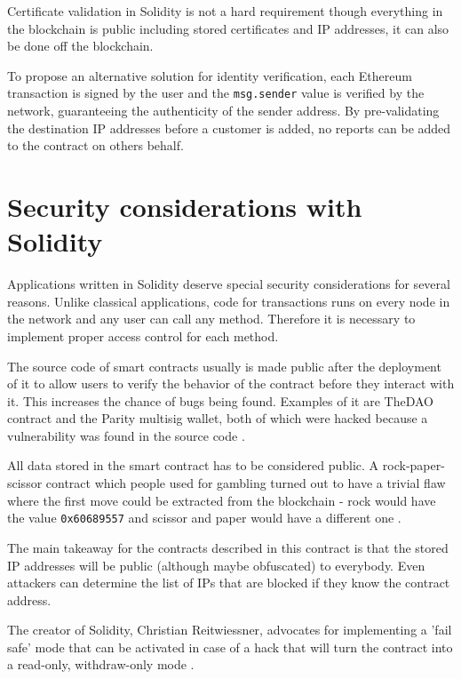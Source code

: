 Certificate validation in Solidity is not a hard requirement though \textemdash{} everything in the blockchain is public including stored certificates and IP addresses, it can also be done off the blockchain.

To propose an alternative solution for identity verification, each Ethereum transaction is signed by the user and the \texttt{msg.sender} value is verified by the network, guaranteeing the authenticity of the sender address. By pre-validating the destination IP addresses before a customer is added, no reports can be added to the contract on others behalf.


\section{Security considerations with Solidity}

Applications written in Solidity deserve special security considerations for several reasons.
Unlike classical applications, code for transactions runs on every node in the network and any user can call any method. Therefore it is necessary to implement proper access control for each method.

The source code of smart contracts usually is made public after the deployment of it to allow users to verify the behavior of the contract before they interact with it. This increases the chance of bugs being found. Examples of it are TheDAO contract and the Parity multisig wallet, both of which were hacked because a vulnerability was found in the source code \cite{DAO} \cite{MultisigHack}.

All data stored in the smart contract has to be considered public. A rock-paper-scissor contract which people used for gambling turned out to have a trivial flaw where the first move could be extracted from the blockchain - rock would have the value \texttt{0x60689557} and scissor and paper would have a different one \cite{ThinkingAboutSmartContractSecurity}.

The main takeaway for the contracts described in this contract is that the stored IP addresses will be public (although maybe obfuscated) to everybody. Even attackers can determine the list of IPs that are blocked if they know the contract address.

The creator of Solidity, Christian Reitwiessner, advocates for implementing a 'fail safe' mode that can be activated in case of a hack that will turn the contract into a read-only, withdraw-only mode \cite{FailsafeMode}.

